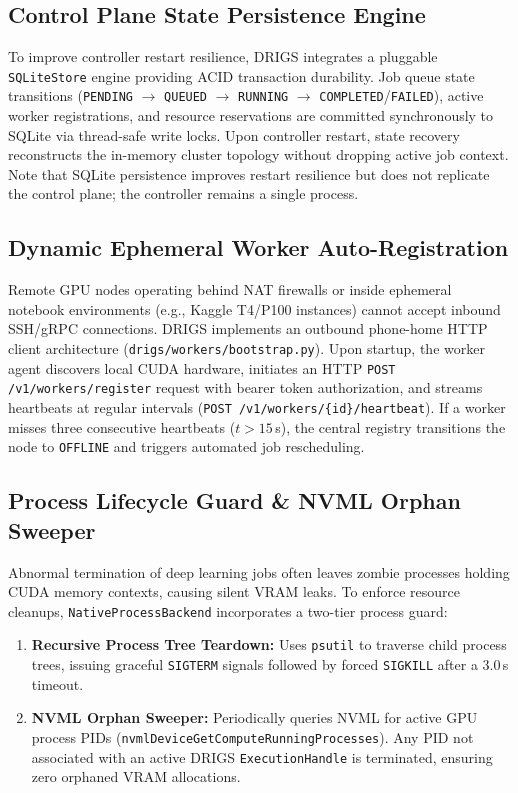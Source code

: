 \subsection{Control Plane State Persistence Engine}
To improve controller restart resilience, DRIGS integrates a pluggable \texttt{SQLiteStore} engine providing ACID transaction durability. Job queue state transitions (\texttt{PENDING} $\rightarrow$ \texttt{QUEUED} $\rightarrow$ \texttt{RUNNING} $\rightarrow$ \texttt{COMPLETED}/\texttt{FAILED}), active worker registrations, and resource reservations are committed synchronously to SQLite via thread-safe write locks. Upon controller restart, state recovery reconstructs the in-memory cluster topology without dropping active job context. Note that SQLite persistence improves restart resilience but does not replicate the control plane; the controller remains a single process.

\subsection{Dynamic Ephemeral Worker Auto-Registration}
Remote GPU nodes operating behind NAT firewalls or inside ephemeral notebook environments (e.g., Kaggle T4/P100 instances) cannot accept inbound SSH/gRPC connections. DRIGS implements an outbound phone-home HTTP client architecture (\texttt{drigs/workers/bootstrap.py}). Upon startup, the worker agent discovers local CUDA hardware, initiates an HTTP \texttt{POST /v1/workers/register} request with bearer token authorization, and streams heartbeats at regular intervals (\texttt{POST /v1/workers/\{id\}/heartbeat}). If a worker misses three consecutive heartbeats ($t > 15$\,s), the central registry transitions the node to \texttt{OFFLINE} and triggers automated job rescheduling.

\subsection{Process Lifecycle Guard \& NVML Orphan Sweeper}
Abnormal termination of deep learning jobs often leaves zombie processes holding CUDA memory contexts, causing silent VRAM leaks. To enforce resource cleanups, \texttt{NativeProcessBackend} incorporates a two-tier process guard:
\begin{enumerate}
    \item \textbf{Recursive Process Tree Teardown:} Uses \texttt{psutil} to traverse child process trees, issuing graceful \texttt{SIGTERM} signals followed by forced \texttt{SIGKILL} after a $3.0$\,s timeout.
    \item \textbf{NVML Orphan Sweeper:} Periodically queries NVML for active GPU process PIDs (\texttt{nvmlDeviceGetComputeRunningProcesses}). Any PID not associated with an active DRIGS \texttt{ExecutionHandle} is terminated, ensuring zero orphaned VRAM allocations.
\end{enumerate}
